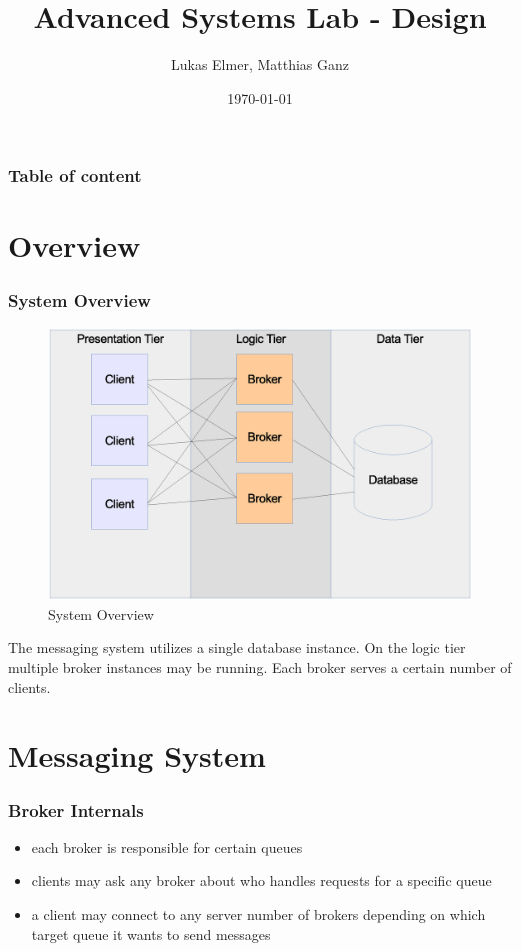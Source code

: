 \documentclass{beamer}
\title{Advanced Systems Lab - Design}
\author{Lukas Elmer, Matthias Ganz}
\date{\today}
\begin{document}
\begin{frame}
\titlepage
\end{frame} 

\begin{frame}
\frametitle{Table of content}
\tableofcontents
\end{frame} 



\section{Overview}
\begin{frame}
\frametitle{System Overview}

\begin{figure}
  \begin{center}
    \includegraphics[scale=0.2]{../../drawings/system-overview.eps}
  \end{center}
  \caption{System Overview}
  \label{fig:system-overview}
\end{figure}

The messaging system utilizes a single database instance. On the logic tier multiple broker instances may be running. Each broker serves a certain number of clients.


\end{frame}

\section{Messaging System}

\begin{frame}
\frametitle{Broker Internals}
\begin{itemize}
\item each broker is responsible for certain queues
\item clients may ask any broker about who handles requests for a specific queue
\item a client may connect to any server number of brokers depending on which target queue it wants to send messages
\end{itemize}
\end{frame}
\end{document}
